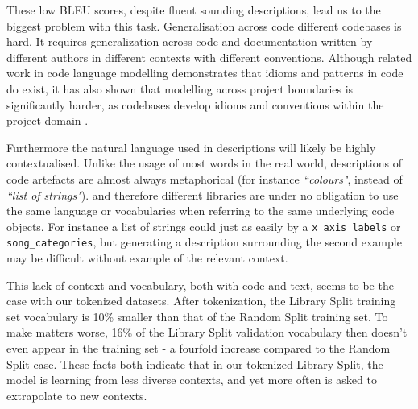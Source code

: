 These low BLEU scores, despite fluent sounding descriptions, lead us to the biggest problem with this task.
Generalisation across code different codebases is hard.  It requires generalization across code and documentation written by different authors in different contexts with different conventions. 
Although related work in code language modelling demonstrates that idioms and patterns in code do exist\cite{allamanis_mining_nodate}, it has also shown that modelling across project boundaries is significantly harder,
as codebases develop idioms and conventions within the project domain \cite{hinton_distributed_nodate}. 

Furthermore the natural language used in descriptions will likely be highly contextualised. 
Unlike the usage of most words in the real world, descriptions of code artefacts are almost always metaphorical (for instance \textit{``colours"}, instead of \textit{``list of strings"}).  and therefore different libraries are under no obligation to use the same language or vocabularies when referring to the same underlying code objects. 
For instance a list of strings could just as easily by a \texttt{x_axis_labels} or \texttt{song_categories}, but generating a description surrounding the second example may be difficult without example of the relevant context.

This lack of context and vocabulary, both with code and text,  seems to be the case with our tokenized datasets.
After tokenization, the Library Split training set vocabulary is 10\% smaller than that of the Random Split training set. To make matters worse, 16\% of the Library Split validation vocabulary then doesn't even appear in the training set - a fourfold increase compared to the Random Split case.
These facts both indicate that in our tokenized Library Split, the model is learning from less diverse contexts, and yet more often is asked to extrapolate to new contexts.



